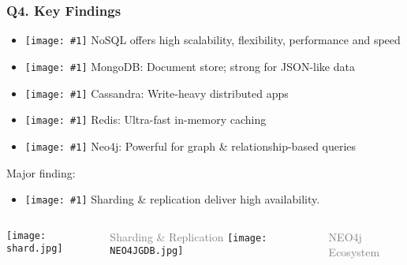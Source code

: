 \documentclass{beamer}
\newcommand{\icon}[1]{\texttt{[image: \#1]}}
\begin{document}
\begin{frame}[t]
\frametitle{Q4. Key Findings}
\vspace{-0.4cm}
\begin{itemize}
    \item\icon{no-sql-logo.png} NoSQL offers high scalability, flexibility, performance and speed\\
    \item \icon{mongodb_logo.png} MongoDB: Document store; strong for JSON-like data
    \item \icon{Cassandra_logo.png} Cassandra: Write-heavy distributed apps
    \item \icon{redis-logo.png} Redis: Ultra-fast in-memory caching
    \item \icon{neo4j-logo.png} Neo4j: Powerful for graph \& relationship-based queries
\end{itemize}
\vspace{-0.15cm}
\begin{block}{Major finding:}
    \begin{itemize}
        \item \icon{check-mark.png} Sharding \& replication deliver high availability.
    \end{itemize}
\end{block}
\vspace{0.1cm}
\begin{columns}
    \hspace*{0.5cm}\texttt{[image: shard.jpg]}
    \par\scriptsize\textcolor{gray}{Sharding \& Replication}
    \hspace*{0.5cm}\texttt{[image: NEO4JGDB.jpg]}
    \par\scriptsize\textcolor{gray}{NEO4j Ecosystem}
\end{columns}
\end{frame}
\end{document}
